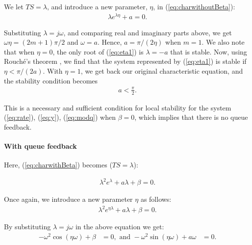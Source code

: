 \documentclass[conference]{IEEEtran}
\begin{document}
We let $TS = \lambda$, and introduce a new parameter, $\eta$, in (\ref{eq:charwithoutBeta}):
\begin{equation}
\label{eq:eta1}
\begin{aligned}
\lambda e^{\lambda\eta} + a = 0.
\end{aligned}
\end{equation}

Substituting $\lambda = j\omega$, and comparing real and imaginary parts above, we get $\omega\eta = \left(2m + 1\right)\pi/2$ and $\omega = a$. Hence, $a = \pi/\left(2\eta\right)$ when $m = 1$. We also note that when $\eta= 0$, the only root of 
(\ref{eq:eta1}) is $\lambda = -a$ that is stable. Now, using Rouch\'{e}'s theorem 
\cite{lang}, we find that the system represented by 
(\ref{eq:eta1}) is stable if $\eta < \pi/\left(2a\right)$. 
With $\eta = 1$, we get back our original characteristic equation, and the stability condition becomes  
\begin{equation}
\label{eq:stablenob}
\begin{aligned}
a < \frac{\pi}{2}.
\end{aligned}
\end{equation}

This is a 
necessary and sufficient condition for local stability for the system  
(\ref{eq:rate}), (\ref{eq:y}), (\ref{eq:modq}) when $\beta = 0$, which implies that there 
is no queue feedback.

\paragraph{With queue feedback}
Here, (\ref{eq:charwithBeta}) becomes ($TS=\lambda$):

\begin{equation}
\label{eq:characteristic}
\begin{aligned}
\lambda^{2}e^{\lambda} + a\lambda + \beta = 0.
\end{aligned}
\end{equation} 

Once again, we introduce a new parameter $\eta$ as follows:
\begin{equation}
\begin{aligned}
\label{eq:eta} 
\lambda^{2}e^{\eta\lambda} + a\lambda + \beta = 0.
\end{aligned}
\end{equation}

By substituting $\lambda = j\omega$ in the above equation we get:
\begin{equation}
\begin{aligned}
-\omega^{2}\cos\left(\eta\omega\right) + \beta &= 0,\text{ and } 
-\omega^{2}\sin\left(\eta\omega\right) + a\omega &= 0.
\end{aligned}
\end{equation}
\end{document}
